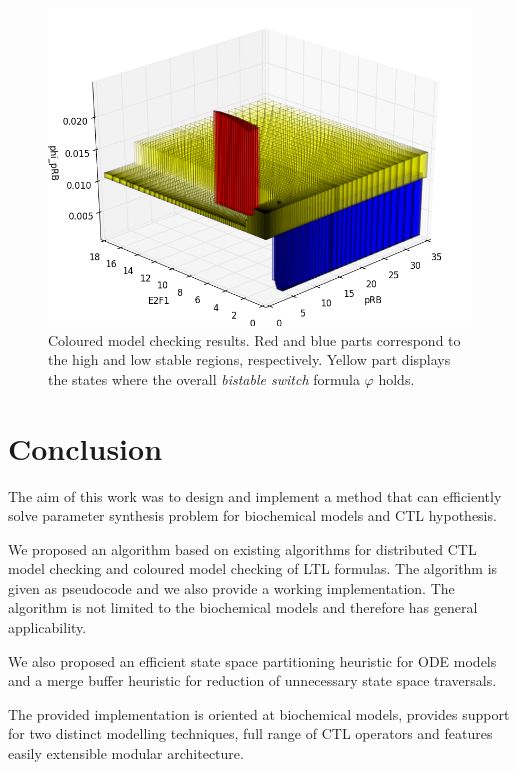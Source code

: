 \documentclass[12pt,oneside]{fithesis2}
\begin{document}
\begin{figure}
\begin{center}
\includegraphics[scale=.35]{3d.png}
\end{center}
\vspace*{-0.5em}
\caption{Coloured model checking results. Red and blue parts
  correspond to the high and low stable regions, respectively. Yellow part
  displays the states where the overall \emph{bistable switch} formula $\varphi$
  holds.}
\label{fig:3dresults}
\end{figure}

	\chapter{Conclusion}
		
		The aim of this work was to design and implement a method that can efficiently solve parameter synthesis problem for biochemical models and CTL hypothesis. 
		
		We proposed an algorithm based on existing algorithms for distributed CTL model checking and coloured model checking of LTL formulas. The algorithm is given as pseudocode and we also provide a working implementation. The algorithm is not limited to the biochemical models and therefore has general applicability.

		We also proposed an efficient state space partitioning heuristic for ODE models and a merge buffer heuristic for reduction of unnecessary state space traversals.
				
		The provided implementation is oriented at biochemical models, provides support for two distinct modelling techniques, full range of CTL operators and features easily extensible modular architecture.
		
\end{document}
